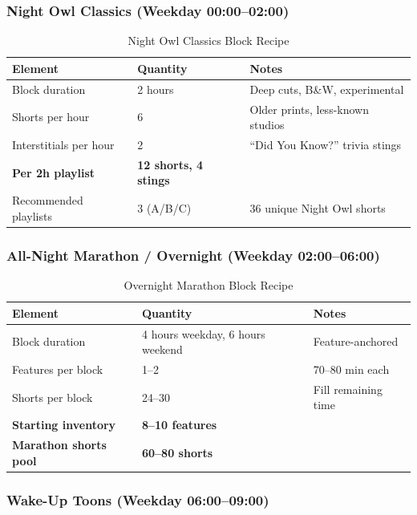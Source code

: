 \documentclass[12pt,letterpaper,twoside]{report}
\begin{document}
\subsubsection{Night Owl Classics (Weekday 00:00--02:00)}

\begin{table}[H]
\centering
\caption{Night Owl Classics Block Recipe}
\begin{tabular}{@{}L{4cm}L{3cm}L{6cm}@{}}
\toprule
\textbf{Element} & \textbf{Quantity} & \textbf{Notes} \\
\midrule
Block duration & 2 hours & Deep cuts, B\&W, experimental \\
Shorts per hour & 6 & Older prints, less-known studios \\
Interstitials per hour & 2 & ``Did You Know?'' trivia stings \\
\midrule
\textbf{Per 2h playlist} & \textbf{12 shorts, 4 stings} & \\
\midrule
Recommended playlists & 3 (A/B/C) & 36 unique Night Owl shorts \\
\bottomrule
\end{tabular}
\end{table}

\subsubsection{All-Night Marathon / Overnight (Weekday 02:00--06:00)}

\begin{table}[H]
\centering
\caption{Overnight Marathon Block Recipe}
\begin{tabular}{@{}L{4cm}L{3cm}L{6cm}@{}}
\toprule
\textbf{Element} & \textbf{Quantity} & \textbf{Notes} \\
\midrule
Block duration & 4 hours weekday, 6 hours weekend & Feature-anchored \\
Features per block & 1--2 & 70--80 min each \\
Shorts per block & 24--30 & Fill remaining time \\
\midrule
\textbf{Starting inventory} & \textbf{8--10 features} & \\
\textbf{Marathon shorts pool} & \textbf{60--80 shorts} & \\
\bottomrule
\end{tabular}
\end{table}

\subsubsection{Wake-Up Toons (Weekday 06:00--09:00)}
\end{document}
